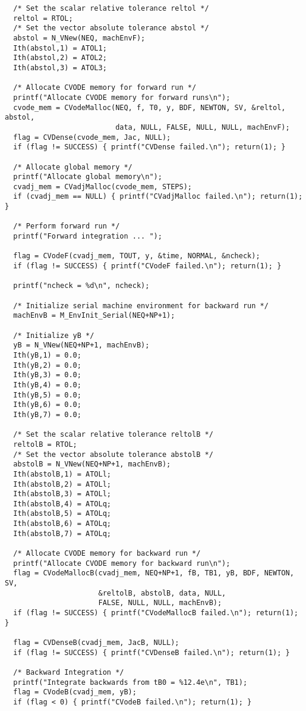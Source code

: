 \begin{verbatim}
  /* Set the scalar relative tolerance reltol */
  reltol = RTOL;               
  /* Set the vector absolute tolerance abstol */
  abstol = N_VNew(NEQ, machEnvF); 
  Ith(abstol,1) = ATOL1;       
  Ith(abstol,2) = ATOL2;
  Ith(abstol,3) = ATOL3;

  /* Allocate CVODE memory for forward run */
  printf("Allocate CVODE memory for forward runs\n");
  cvode_mem = CVodeMalloc(NEQ, f, T0, y, BDF, NEWTON, SV, &reltol, abstol,
                          data, NULL, FALSE, NULL, NULL, machEnvF);
  flag = CVDense(cvode_mem, Jac, NULL);
  if (flag != SUCCESS) { printf("CVDense failed.\n"); return(1); }

  /* Allocate global memory */
  printf("Allocate global memory\n");
  cvadj_mem = CVadjMalloc(cvode_mem, STEPS);
  if (cvadj_mem == NULL) { printf("CVadjMalloc failed.\n"); return(1); }

  /* Perform forward run */
  printf("Forward integration ... ");
  
  flag = CVodeF(cvadj_mem, TOUT, y, &time, NORMAL, &ncheck);
  if (flag != SUCCESS) { printf("CVodeF failed.\n"); return(1); }

  printf("ncheck = %d\n", ncheck);

  /* Initialize serial machine environment for backward run */ 
  machEnvB = M_EnvInit_Serial(NEQ+NP+1);

  /* Initialize yB */
  yB = N_VNew(NEQ+NP+1, machEnvB);
  Ith(yB,1) = 0.0;
  Ith(yB,2) = 0.0;
  Ith(yB,3) = 0.0;
  Ith(yB,4) = 0.0;
  Ith(yB,5) = 0.0;
  Ith(yB,6) = 0.0;
  Ith(yB,7) = 0.0;

  /* Set the scalar relative tolerance reltolB */
  reltolB = RTOL;               
  /* Set the vector absolute tolerance abstolB */
  abstolB = N_VNew(NEQ+NP+1, machEnvB); 
  Ith(abstolB,1) = ATOLl;       
  Ith(abstolB,2) = ATOLl;
  Ith(abstolB,3) = ATOLl;
  Ith(abstolB,4) = ATOLq;
  Ith(abstolB,5) = ATOLq;
  Ith(abstolB,6) = ATOLq;
  Ith(abstolB,7) = ATOLq;

  /* Allocate CVODE memory for backward run */
  printf("Allocate CVODE memory for backward run\n");
  flag = CVodeMallocB(cvadj_mem, NEQ+NP+1, fB, TB1, yB, BDF, NEWTON, SV, 
                      &reltolB, abstolB, data, NULL, 
                      FALSE, NULL, NULL, machEnvB);
  if (flag != SUCCESS) { printf("CVodeMallocB failed.\n"); return(1); }

  flag = CVDenseB(cvadj_mem, JacB, NULL);
  if (flag != SUCCESS) { printf("CVDenseB failed.\n"); return(1); }

  /* Backward Integration */
  printf("Integrate backwards from tB0 = %12.4e\n", TB1);
  flag = CVodeB(cvadj_mem, yB);
  if (flag < 0) { printf("CVodeB failed.\n"); return(1); }


\end{verbatim}
